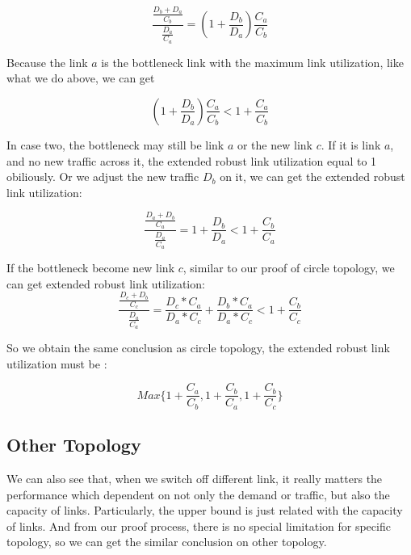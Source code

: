 \documentclass[conference]{IEEEtran}
\begin{document}
\begin{equation}
    \frac {\frac{D_b + D_a}{C_b}}{\frac{D_a}{C_a}} = (1+\frac{D_b}{D_a}) \frac{C_a}{C_b}
\end{equation}

Because the link $a$ is the bottleneck link with the maximum link utilization, like what we do above, we can get 

\begin{equation}
    (1+\frac{D_b}{D_a}) \frac{C_a}{C_b} < 1 + \frac{C_a}{C_b}
\end{equation}

In case two, the bottleneck may still be link $a$ or the new link $c$. If it is link $a$, and no new traffic across it,
the extended robust link utilization equal to 1 obiliously. Or we adjust the new traffic $D_b$ on it, we can get the
extended robust link utilization:

\begin{equation}
    \frac{\frac{D_a + D_b}{C_a}}{\frac{D_a}{C_a}} = 1 + \frac{D_b}{D_a} < 1 + \frac{C_b}{C_a}
\end{equation}

If the bottleneck become new link $c$, similar to our proof of circle topology, we can get extended robust link utilization:
\begin{equation}
    \frac{\frac{D_c + D_b}{C_c}}{\frac{D_a}{C_a}} = \frac{D_c * C_a}{D_a * C_c} + \frac{D_b * C_a}{D_a * C_c} < 1 + \frac{C_b}{C_c}
\end{equation}

So we obtain the same conclusion as circle topology, the extended robust link utilization must be :

\begin{equation}
    Max\{1 + \frac{C_a}{C_b}, 1 + \frac{C_b}{C_a}, 1 + \frac{C_b}{C_c}\}
\end{equation}

\subsection{Other Topology}
We can also see that, when we switch off different link, it really matters the performance which dependent on not only the 
demand or traffic, but also the capacity of links. Particularly, the upper bound is just related with the capacity of links.
And from our proof process, there is no special limitation for specific topology, so we can get the similar conclusion 
on other topology.
\end{document}
